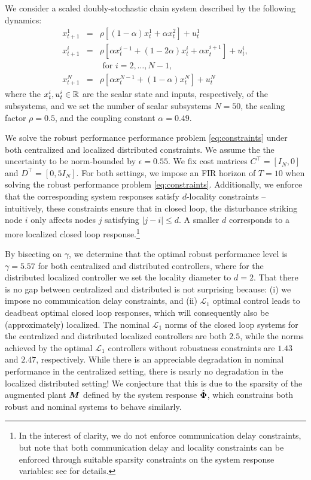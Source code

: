 We consider a scaled doubly-stochastic chain system described by the following dynamics:
\begin{equation}\label{eq:chain}
\begin{array}{rcl}
x^1_{t+1} &=& \rho\left[(1-\alpha)x^1_t + \alpha x^2_t\right] + u^1_t\\
x^i_{t+1} &=& \rho\left[\alpha x^{i-1}_t + (1-2\alpha)x^i_t + \alpha x^{i+1}_t\right] + u^i_t,\\
&& \text{ for $i=2,\dots,N-1$,} \\
 x^N_{t+1} &=& \rho\left[\alpha x^{N-1}_t + (1-\alpha)x^N_t\right] + u^N_t
 \end{array}
\end{equation}
where the $x^i_t, u^i_t \in \mathbb{R}$ are the scalar state and inputs, respectively, of the subsystems, and we set the number of scalar subsystems $N=50$, the scaling factor $\rho = 0.5$, and the coupling constant $\alpha = 0.49$.  

We solve the robust performance performance problem \eqref{eq:constraints} under both centralized and localized distributed constraints. We assume the the uncertainty to be norm-bounded by $\epsilon = 0.55$. We fix cost matrices $C^\top = [I_N, 0]$ and $D^\top = [0, 5I_N]$.  For both settings, we impose an FIR horizon of $T=10$ when solving the robust performance problem \eqref{eq:constraints}.  Additionally, we enforce that the corresponding system responses satisfy $d$-locality constraints -- intuitively, these constraints ensure that in closed loop, the disturbance striking node $i$ only affects nodes $j$ satisfying $|j-i|\leq d$. A smaller $d$ corresponds to a more localized closed loop response.\footnote{In the interest of clarity, we do not enforce communication delay constraints, but note that both communication delay and locality constraints can be enforced through suitable sparsity constraints on the system response variables: see \cite{anderson2019system} for details.}

By bisecting on $\gamma$, we determine that the optimal robust performance level is $\gamma = 5.57$ for both centralized and distributed controllers, where for the distributed localized controller we set the locality diameter to $d=2$.  That there is no gap between centralized and distributed is not surprising because: (i) we impose no communication delay constraints, and (ii) $\mathcal{L}_1$ optimal control leads to deadbeat optimal closed loop responses, which will consequently also be (approximately) localized.  The nominal $\mathcal{L}_1$ norms of the closed loop systems for the centralized and distributed localized controllers are both $2.5$, while the norms achieved by the optimal $\mathcal{L}_1$ controllers without robustness constraints are $1.43$ and $2.47$, respectively.  While there is an appreciable degradation in nominal performance in the centralized setting, there is nearly no degradation in the localized distributed setting!  We conjecture that this is due to the sparsity of the augmented plant $\boldsymbol{M}$ defined by the system response $\hat{\boldsymbol{\Phi}}$, which constrains both robust and nominal systems to behave similarly.

